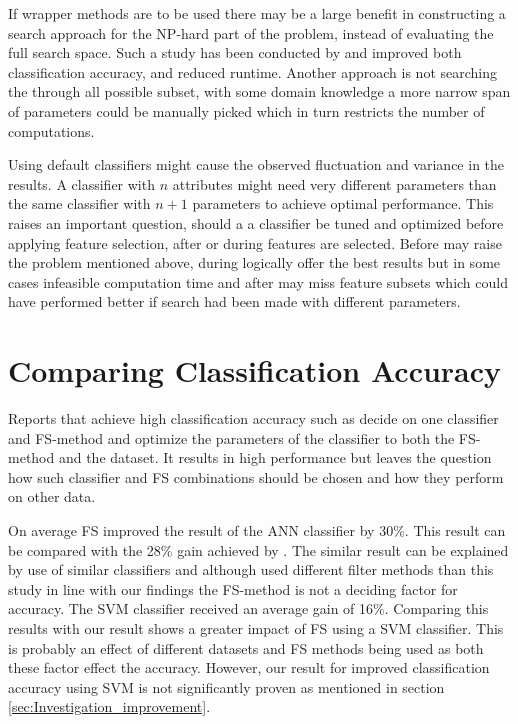If wrapper methods are to be used there may be a large benefit in constructing a search approach for the NP-hard part of the problem, instead of evaluating the full search space. Such a study has been conducted by \textcite{panthong2015} and improved both classification accuracy, and reduced runtime. Another approach is not searching the through all possible subset, with some domain knowledge a more narrow span of parameters could be manually picked which in turn restricts the number of computations.

Using default classifiers might cause the observed fluctuation and variance in the results. A classifier with $n$ attributes might need very different parameters than the same classifier with $n + 1$ parameters to achieve optimal performance. This raises an important question, should a a classifier be tuned and optimized before applying feature selection, after or during features are selected. Before may raise the problem mentioned above, during logically offer the best results but in some cases infeasible computation time and after may miss feature subsets which could have performed better if search had been made with different parameters.

\section{Comparing Classification Accuracy}
\label{sec:Comparing_Classification_Accuracy}

Reports that achieve high classification accuracy such as \textcite{akay2009} decide on one classifier and FS-method and optimize the parameters of the classifier to both the FS-method and the dataset. It results in high performance but leaves the question how such classifier and FS combinations should be chosen and how they perform on other data.

On average FS improved the result of the ANN classifier by 30\%. This result can be compared with the 28\% gain achieved by \textcite{karabulut2012}. The similar result can be explained by use of similar classifiers and although \textcite{karabulut2012} used different filter methods than this study in line with our findings the FS-method is not a deciding factor for accuracy. The SVM classifier received an average gain of 16\%. Comparing this results with \textcite{b20103177} our result shows a greater impact of FS using a SVM classifier. This is probably an effect of different datasets and FS methods being used as both these factor effect the accuracy. However, our result for improved classification accuracy using SVM is not significantly proven as mentioned in section \ref{sec:Investigation_improvement}.

